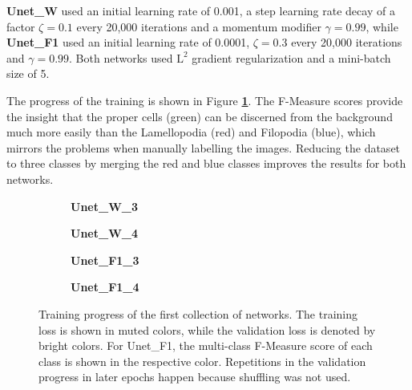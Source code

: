 \textbf{Unet\_W} used an initial learning rate of 0.001, a step learning rate decay of a factor $\zeta = 0.1$ every 20,000 iterations and a momentum modifier $\gamma = 0.99$, while \textbf{Unet\_F1} used an initial learning rate of 0.0001, $\zeta = 0.3$ every 20,000 iterations and $\gamma = 0.99$. Both networks used $\text{L}^2$ gradient regularization and a mini-batch size of 5.

The progress of the training is shown in Figure \textbf{\ref{fig:weighted_f1_training}}. The F-Measure scores provide the insight that the proper cells (green) can be discerned from the background much more easily than the Lamellopodia (red) and Filopodia (blue), which mirrors the problems when manually labelling the images. Reducing the dataset to three classes by merging the red and blue classes improves the results for both networks.\\

\begin {figure}[!ht]
	\begin {subfigure}[b]{0.4\linewidth}
		\scalebox{0.65}{}
		\caption{\textbf{Unet\_W\_3}}
	\end {subfigure}\hspace{1.75cm}
	\begin {subfigure}[b]{0.4\linewidth}
		\scalebox{0.65}{}
		\caption{\textbf{Unet\_W\_4}}
	\end {subfigure}

	\begin {subfigure}[b]{0.4\linewidth}
		\scalebox{0.65}{}
		\caption{\textbf{Unet\_F1\_3}}
	\end {subfigure}\hspace{1.75cm}
	\begin {subfigure}[b]{0.4\linewidth}
		\scalebox{0.65}{}
		\caption{\textbf{Unet\_F1\_4}}
	\end {subfigure}

		\caption[Training progress of the first collection of networks.]{Training progress of the first collection of networks. The training loss is shown in muted colors, while the validation loss is denoted by bright colors. For Unet\_F1, the multi-class F-Measure score of each class is shown in the respective color. Repetitions in the validation progress in later epochs happen because shuffling was not used.}
		\label{fig:weighted_f1_training}
\end {figure}


